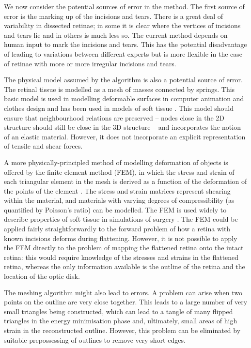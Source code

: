 \documentclass[10pt]{article}
\begin{document}
We now consider the potential sources of error in the method. The
first source of error is the marking up of the incisions and
tears. There is a great deal of variability in dissected retinae; in
some it is clear where the vertices of incisions and tears lie and in
others is much less so. The current method depends on human input to
mark the incisions and tears. This has the potential disadvantage of
leading to variations between different experts but is more flexible
in the case of retinae with more or more irregular incisions and
tears. 

The physical model assumed by the algorithm is also a potential source
of error. The retinal tissue is modelled as a mesh of masses connected
by springs. This basic model is used in modelling deformable surfaces
in computer animation and clothes design
\cite{FanEtal98spri,MaCaEtal99flat,WangEtal02surf} and has been used
in models of soft tissue \cite{SkriDunc99real}.  This model should
ensure that neighbourhood relations are preserved -- nodes close in
the 2D structure should still be close in the 3D structure -- and
incorporates the notion of an elastic material. However, it does not
incorporate an explicit representation of tensile and shear forces.

A more physically-principled method of modelling deformation of
objects is offered by the finite element method (FEM), in which the
stress and strain of each triangular element in the mesh is derived as
a function of the deformation of the points of the element
\cite{ZienTayl00fini}. The stress and strain matrices represent
shearing within the material, and materials with varying degrees of
compressibility (as quantified by Poisson's ratio) can be modelled.
The FEM is used widely to describe properties of soft tissue in
simulations of surgery \cite{CartEtal05appl}. The FEM could be applied
fairly straightforwardly to the forward problem of how a retina with
known incisions deforms during flattening. However, it is not possible
to apply the FEM directly to the problem of mapping the flattened
retina onto the intact retina: this would require knowledge of the
stresses and strains in the flattened retina, whereas the only
information available is the outline of the retina and the location of
the optic disk.

The meshing algorithm might also lead to errors. A problem can arise
when two points on the outline are very close together. This leads to
a large number of very small triangles being constructed, which can
lead to a tangle of many flipped triangles in the energy minimisation
phase and, ultimately, small areas of high strain in the reconstructed
outline. However, this problem can be eliminated by suitable
prepossessing of outlines to remove very short edges.
\end{document}
